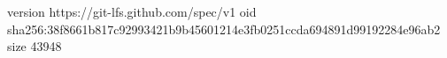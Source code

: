 version https://git-lfs.github.com/spec/v1
oid sha256:38f8661b817c92993421b9b45601214e3fb0251ccda694891d99192284e96ab2
size 43948
